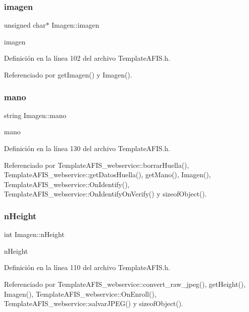 \subsubsection{\texorpdfstring{imagen}{imagen}}
{\footnotesize\ttfamily unsigned char$\ast$ Imagen\+::imagen}



imagen 



Definición en la línea 102 del archivo Template\+A\+F\+I\+S.\+h.



Referenciado por get\+Imagen() y Imagen().

\hypertarget{classImagen_a6ac88dc4f15daed005f1055235020821}{}\label{classImagen_a6ac88dc4f15daed005f1055235020821} 
\subsubsection{\texorpdfstring{mano}{mano}}
{\footnotesize\ttfamily string Imagen\+::mano}



mano 



Definición en la línea 130 del archivo Template\+A\+F\+I\+S.\+h.



Referenciado por Template\+A\+F\+I\+S\+\_\+webservice\+::borrar\+Huella(), Template\+A\+F\+I\+S\+\_\+webservice\+::get\+Datos\+Huella(), get\+Mano(), Imagen(), Template\+A\+F\+I\+S\+\_\+webservice\+::\+On\+Identify(), Template\+A\+F\+I\+S\+\_\+webservice\+::\+On\+Identify\+On\+Verify() y sizeof\+Object().

\hypertarget{classImagen_a92935096f7cbcc6ffe32dde43038288c}{}\label{classImagen_a92935096f7cbcc6ffe32dde43038288c} 
\subsubsection{\texorpdfstring{n\+Height}{nHeight}}
{\footnotesize\ttfamily int Imagen\+::n\+Height}



n\+Height 



Definición en la línea 110 del archivo Template\+A\+F\+I\+S.\+h.



Referenciado por Template\+A\+F\+I\+S\+\_\+webservice\+::convert\+\_\+raw\+\_\+jpeg(), get\+Height(), Imagen(), Template\+A\+F\+I\+S\+\_\+webservice\+::\+On\+Enroll(), Template\+A\+F\+I\+S\+\_\+webservice\+::salvar\+J\+P\+E\+G() y sizeof\+Object().

